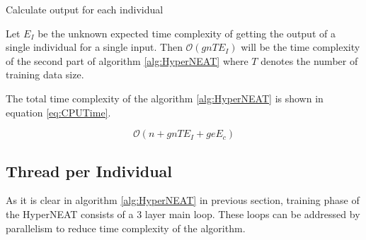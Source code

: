 \documentclass[twocolumn]{article}
\begin{document}
\begin{algorithm}
    \caption{Calculate output for each individual}
    \label{alg:Individual}
    \begin{algorithmic}[1]
                    \EndIf
                \EndFor
            \EndFor
            \EndFor
            \EndFor
            \State {}
        \EndProcedure
                \State {}
            \EndIf
            \EndFor
            \State {}
        \EndProcedure
    \end{algorithmic}
\end{algorithm}

Let $E_I$ be the unknown expected time complexity of getting the output of a single individual for a single input. Then $\mathcal{O}(gnTE_I)$ will be the time complexity of the second part of algorithm \ref{alg:HyperNEAT} where $T$ denotes the number of training data size.

The total time complexity of the algorithm \ref{alg:HyperNEAT} is shown in equation \ref{eq:CPUTime}.

\begin{equation}
    \label{eq:CPUTime}
    \mathcal{O}(n+gnTE_I+geE_c)
\end{equation}

\subsection{Thread per Individual}

As it is clear in algorithm \ref{alg:HyperNEAT} in previous section, training phase of the HyperNEAT consists of a 3 layer main loop. These loops can be addressed by parallelism to reduce time complexity of the algorithm.
\end{document}

